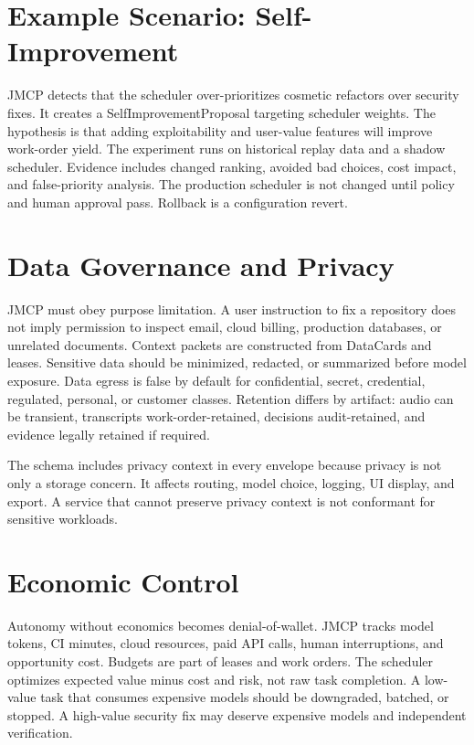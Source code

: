 \documentclass[10pt,journal,onecolumn]{IEEEtran}
\begin{document}
\section{Example Scenario: Self-Improvement}
JMCP detects that the scheduler over-prioritizes cosmetic refactors over security fixes. It creates a SelfImprovementProposal targeting scheduler weights. The hypothesis is that adding exploitability and user-value features will improve work-order yield. The experiment runs on historical replay data and a shadow scheduler. Evidence includes changed ranking, avoided bad choices, cost impact, and false-priority analysis. The production scheduler is not changed until policy and human approval pass. Rollback is a configuration revert.

\section{Data Governance and Privacy}
JMCP must obey purpose limitation. A user instruction to fix a repository does not imply permission to inspect email, cloud billing, production databases, or unrelated documents. Context packets are constructed from DataCards and leases. Sensitive data should be minimized, redacted, or summarized before model exposure. Data egress is false by default for confidential, secret, credential, regulated, personal, or customer classes. Retention differs by artifact: audio can be transient, transcripts work-order-retained, decisions audit-retained, and evidence legally retained if required.

The schema includes privacy context in every envelope because privacy is not only a storage concern. It affects routing, model choice, logging, UI display, and export. A service that cannot preserve privacy context is not conformant for sensitive workloads.

\section{Economic Control}
Autonomy without economics becomes denial-of-wallet. JMCP tracks model tokens, CI minutes, cloud resources, paid API calls, human interruptions, and opportunity cost. Budgets are part of leases and work orders. The scheduler optimizes expected value minus cost and risk, not raw task completion. A low-value task that consumes expensive models should be downgraded, batched, or stopped. A high-value security fix may deserve expensive models and independent verification.
\end{document}
